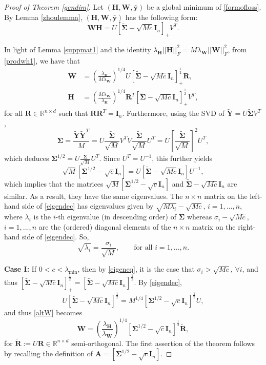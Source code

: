 \documentclass{article}
\theoremstyle{plain}
\theoremstyle{definition}
\theoremstyle{remark}
\newcommand{\bW}{{\mathbf W}}
\newcommand{\bY}{{\mathbf Y}}
\newcommand{\bR}{{\mathbf R}}
\newcommand{\bA}{{\mathbf A}}
\newcommand{\bH}{{\mathbf H}}
\newcommand{\bI}{{\mathbf I}}
\newcommand{\byb}{{\bar{\mathbf y}}}
\newcommand{\bSigma}{{\mathbf \Sigma}}
\newcommand{\lH}{\lambda_{\bH}}
\newcommand{\lW}{\lambda_{\bW}}
\begin{document}
\begin{proof}[Proof of Theorem \ref{gendim}]

Let $(\bH, \bW, \byb)$ be a global minimum of \eqref{formofloss}. By Lemma \ref{zhoulemma}, $(\bH, \bW, \byb)$ has the following form:
\begin{equation} \label{prodwh1}
\bW\bH=U [\tilde{\bSigma}-\sqrt{M c}\bI_n]_{+} V^T.
\end{equation}

In light of Lemma \ref{suppmat1} and the identity $\lH ||\bH||_F^2=M \lW ||\bW||_F^2$, from \eqref{prodwh1}, we have that 
\begin{align} 
    \bW &= \left(\frac{\lH}{M \lW}\right)^{1/4} U [\tilde{\bSigma}-\sqrt{M c} \bI_n]_{+}^{\frac{1}{2}}\bR, \label{altW}
    \\
    \bH &= \left(\frac{M \lW}{\lH}\right)^{1/4} \bR^T [\tilde{\bSigma}-\sqrt{M c} \bI_n]_{+}^{\frac{1}{2}} V^T, \label{altH}
\end{align}
for all $\bR\in \mathbb{R}^{n\times d}$ such that $\bR \bR^T=\bI_n$. Furthermore, using the SVD of $\tilde{\bY}=U \tilde{\bSigma} V^T$,
\[
\bSigma=\frac{\tilde{\bY} \tilde{\bY}^T}{M} = U \frac{\tilde{\bSigma}}{\sqrt{M}} V^T V \frac{\tilde{\bSigma}}{\sqrt{M}} U^T= U \left[\frac{\tilde{\bSigma}}{\sqrt{M}}\right]^2 U^T,
\]
which deduces $\bSigma^{1/2} = U \frac{\tilde{\bSigma}}{\sqrt{M}} U^T$. Since $U^T=U^{-1}$, this further yields   
\begin{equation} \label{eigendec}
\sqrt{M} [\bSigma^{1/2}-\sqrt{c} \bI_n]=U \left[\tilde{\bSigma} -\sqrt{M c}\bI_n\right] U^{-1},
\end{equation}
which implies that the matrices $\sqrt{M} [\bSigma^{1/2}-\sqrt{c} \bI_n]$ and $\tilde{\bSigma} -\sqrt{M c}\bI_n$ are similar. As a result, they have the same eigenvalues.
The $n\times n$ matrix on the left-hand side of \eqref{eigendec} has eigenvalues given by $\sqrt{M \lambda_i}-\sqrt{M c}$, $i=1,..., n$, where $\lambda_i$ is the $i$-th eigenvalue (in descending order) of $\bSigma$ whereas $\sigma_i-\sqrt{M c}$, $i=1,..., n$ are the (ordered) diagonal elements of the $n\times n$ matrix on the right-hand side of \eqref{eigendec}. So, 
\begin{equation} \label{eigeneq}
\sqrt{\lambda_i} = \frac{\sigma_i}{\sqrt{M}}, \qquad \text{for all } i=1,..., n.
\end{equation}

\textbf{Case I:} If $0<c <\lambda_{\text{min}}$, then by \eqref{eigeneq}, it is the case that $\sigma_i>\sqrt{M c}$, $\forall i$, and thus $[\tilde{\bSigma}-\sqrt{M c}\bI_n]^{\frac{1}{2}}_{+}=[\tilde{\bSigma}-\sqrt{M c}\bI_n]^{\frac{1}{2}}$. By \eqref{eigendec}, 
\begin{equation} \label{eigendec1}
     U [\tilde{\bSigma}-\sqrt{M c}\bI_n]^{\frac{1}{2}}=M^{1/4}[\bSigma^{1/2}-\sqrt{c}\bI_n]^{\frac{1}{2}} U,
\end{equation}
and thus \eqref{altW} becomes
\[
\bW = \left(\frac{\lH}{\lW}\right)^{1/4} [\bSigma^{1/2}-\sqrt{c} \bI_n]^{\frac{1}{2}} \tilde{\bR},
\]
for $\tilde{\bR}:=U \bR\in \mathbb{R}^{n\times d}$ semi-orthogonal. The first assertion of the theorem follows by recalling the definition of $\bA=\left[\bSigma^{1/2} -\sqrt{c}\bI_n\right]$.


\end{proof}
\end{document}
